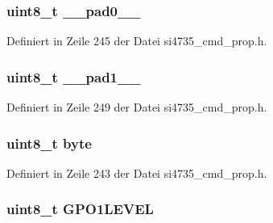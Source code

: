 \subsubsection[{\+\_\+\+\_\+pad0\+\_\+\+\_\+}]{\setlength{\rightskip}{0pt plus 5cm}uint8\+\_\+t \+\_\+\+\_\+pad0\+\_\+\+\_\+}\label{unionfm__gpio__set__arg1_a8b4eebe79ded0459acec2f4950102ba3}


Definiert in Zeile 245 der Datei si4735\+\_\+cmd\+\_\+prop.\+h.

\hypertarget{unionfm__gpio__set__arg1_a77f12d2e278bd5c07712648ac0df5e08}{}
\subsubsection[{\+\_\+\+\_\+pad1\+\_\+\+\_\+}]{\setlength{\rightskip}{0pt plus 5cm}uint8\+\_\+t \+\_\+\+\_\+pad1\+\_\+\+\_\+}\label{unionfm__gpio__set__arg1_a77f12d2e278bd5c07712648ac0df5e08}


Definiert in Zeile 249 der Datei si4735\+\_\+cmd\+\_\+prop.\+h.

\hypertarget{unionfm__gpio__set__arg1_a96f44d20f1dbf1c8785a7bc99a46164c}{}
\subsubsection[{byte}]{\setlength{\rightskip}{0pt plus 5cm}uint8\+\_\+t byte}\label{unionfm__gpio__set__arg1_a96f44d20f1dbf1c8785a7bc99a46164c}


Definiert in Zeile 243 der Datei si4735\+\_\+cmd\+\_\+prop.\+h.

\hypertarget{unionfm__gpio__set__arg1_ad7268074c035672ea0c57aa7ba680317}{}
\subsubsection[{G\+P\+O1\+L\+E\+V\+E\+L}]{\setlength{\rightskip}{0pt plus 5cm}uint8\+\_\+t G\+P\+O1\+L\+E\+V\+E\+L}\label{unionfm__gpio__set__arg1_ad7268074c035672ea0c57aa7ba680317}


